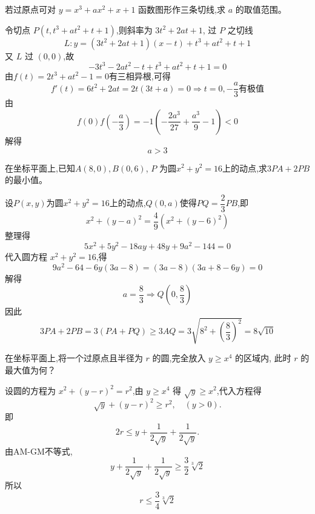 \begin{questions}
    \question 若过原点可对 $y=x^{3}+ax^{2}+x+1$ 函数图形作三条切线,求 $a$ 的取值范围。
    \begin{solution}
        令切点 $P(t,t^3+at^2+t+1)$,则斜率为 $3t^2+2at+1$,  
        过 $P$ 之切线 
        \[
        L: y=(3t^2+2at+1)(x-t)+t^3+at^2+t+1 
        \]
        又 $L$ 过 $(0,0)$,故
        \[
        -3t^3-2at^2-t+t^3+at^2+t+1=0
        \]
        由$f(t)=2t^3+at^2-1=0$有三相异根,可得
        \[
        f'(t)=6t^2+2at=2t(3t+a)=0 \Rightarrow t=0,-\frac{a}{3} \text{有极值}
        \]
        由
        \[
        f(0)f\left(-\frac{a}{3}\right)= -1\left(-\frac{2a^3}{27}+\frac{a^3}{9}-1\right)< 0
        \]
        解得
        \[
        a > 3
        \]
    \end{solution}

    \question 在坐标平面上,已知$A(8,0),B(0,6)$, $P$ 为圆$x^{2}+y^{2}=16$上的动点,求$3PA + 2PB$的最小值。
    \begin{solution}
        设$P(x,y)$为圆$x^{2}+y^{2}=16$上的动点,$Q(0,a)$使得$PQ = \dfrac{2}{3} PB$,即
        \[
        x^{2} + (y - a)^{2} = \frac{4}{9}\left( x^{2} + (y - 6)^{2} \right)
        \]
        整理得
        \[
        5x^{2} + 5y^{2} - 18 a y + 48 y + 9 a^{2} - 144 = 0
        \]
        代入圆方程 $x^{2} + y^{2} = 16$,得
        \[
        9 a^{2} - 64 - 6 y (3 a - 8) = (3 a - 8)(3 a + 8 - 6 y) = 0
        \]
        解得
        \[
        a = \frac{8}{3} \Rightarrow Q \left( 0, \frac{8}{3} \right)
        \]
        因此
        \[
        3 PA + 2 PB = 3(PA + PQ) \ge 3 AQ = 3 \sqrt{8^{2} + \left(\frac{8}{3}\right)^{2}} =8 \sqrt{10}
        \]
    \end{solution}

    \question 在坐标平面上,将一个过原点且半径为 $r$ 的圆,完全放入 $y \ge x^{4}$ 的区域内, 此时 $r$ 的最大值为何？  
    \begin{solution}
        设圆的方程为 $x^2+(y-r)^2=r^2$,由 $y\ge x^4$ 得 $\sqrt{y}\ge x^2$,代入方程得
        \[
        \sqrt{y}+(y-r)^2\ge r^2,\quad (y>0).
        \]
        即
        \[
        2r \le y+\frac{1}{2\sqrt{y}}+\frac{1}{2\sqrt{y}}.
        \]
        由AM-GM不等式,
        \[
        y+\frac{1}{2\sqrt{y}}+\frac{1}{2\sqrt{y}}\ge \frac{3}{2}\sqrt[3]{2}
        \]
        所以
        \[
        r \le \frac{3}{4}\sqrt[3]{2}
        \]
    \end{solution}


\end{questions}
